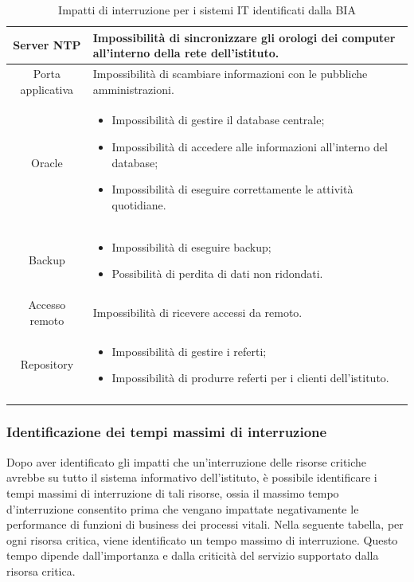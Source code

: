 \documentclass[12pt, a4paper, titlepage]{report}
\begin{document}
\begin{longtable}{| c | p{10cm} |}
				Server NTP & Impossibilità di sincronizzare gli orologi dei computer all'interno della rete dell'istituto.\\ \hline
				Porta applicativa & Impossibilità di scambiare informazioni con le pubbliche amministrazioni.\\ \hline
				Oracle & \begin{itemize}\item Impossibilità di gestire il database centrale; \item Impossibilità di accedere alle informazioni all'interno del database; \item Impossibilità di eseguire correttamente le attività quotidiane.	\end{itemize}\\ \hline
				Backup & \begin{itemize}\item Impossibilità di eseguire backup; \item Possibilità di perdita di dati non ridondati.	\end{itemize}\\ \hline
				Accesso remoto & Impossibilità di ricevere accessi da remoto.\\ \hline
				Repository & \begin{itemize}\item Impossibilità di gestire i referti; \item Impossibilità di produrre referti per i clienti dell'istituto.	\end{itemize}\\ \hline
				\caption[BIA - Impatti d'interruzione per i sistemi IT]{Impatti di interruzione per i sistemi IT identificati dalla BIA}
		\end{longtable}
		
		\subsubsection{Identificazione dei tempi massimi di interruzione}
		
		Dopo aver identificato gli impatti che un'interruzione delle risorse critiche avrebbe su tutto il sistema informativo dell'istituto, è possibile identificare i tempi massimi di interruzione di tali risorse, ossia il massimo tempo d'interruzione consentito prima che vengano impattate negativamente le performance di funzioni di business dei processi vitali. Nella seguente tabella, per ogni risorsa critica, viene identificato un tempo massimo di interruzione. Questo tempo dipende dall'importanza e dalla criticità del servizio supportato dalla risorsa critica.
		
\end{document}
